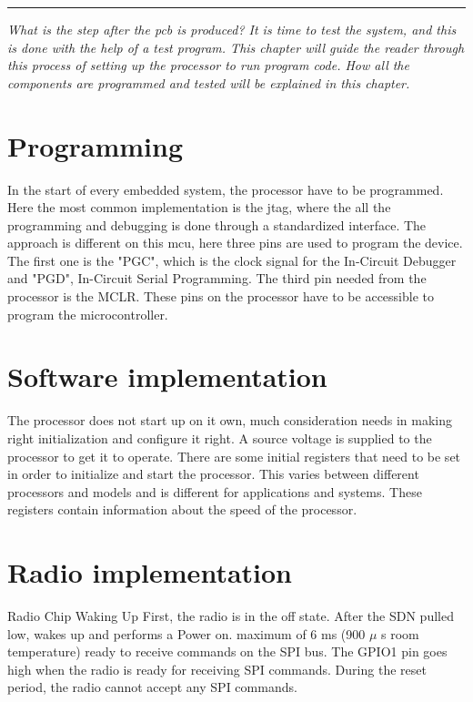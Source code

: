 \vspace{-10ex}%
\rule{\textwidth}{0.3pt}
\vspace{5ex}

\textit{
What is the step after the \gls{pcb} is produced? It is time to test the system, and this is done with the help of a test program. This chapter will guide the reader through this process of setting up the processor to run program code. How all the components are programmed and tested will be explained in this chapter. 
}

\section{Programming} 
In the start of every embedded system, the processor have to be programmed. Here the most common implementation is the \gls{jtag}, where the all the programming and debugging is done through a standardized interface. The approach is different on this \gls{mcu}, here three pins are used to program the device. The first one is the "PGC", which is the clock signal for the In-Circuit Debugger and "PGD", In-Circuit Serial Programming. The third pin needed from the processor is the MCLR. These pins on the processor have to be accessible to program the microcontroller. %


\section{Software implementation}
The processor does not start up on it own, much consideration needs in making right initialization and configure it right. A source voltage is supplied to the processor to get it to operate. There are some initial registers that need to be set in order to initialize and start the processor. This varies between different processors and models and is different for applications and systems. These registers contain information about the speed of the processor.    


\section{Radio implementation} %
Radio Chip Waking Up First, the radio is in the off state. After the SDN pulled low, wakes up and performs a Power on.
maximum of 6 ms  (900 $\mu$ s room temperature) ready to receive commands on the SPI bus. The GPIO1 pin goes high when the radio is ready for receiving SPI commands. During the reset period, the radio cannot accept any SPI commands. 

